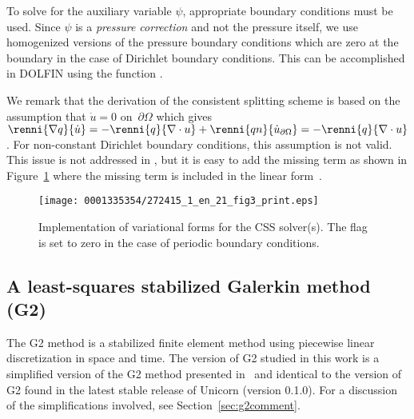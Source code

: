 To solve for the auxiliary variable $\psi$, appropriate boundary
conditions must be used. Since $\psi$ is a \emph{pressure correction}
and not the pressure itself, we use homogenized versions of the
pressure boundary conditions which are zero at the boundary in the
case of Dirichlet boundary conditions. This can be accomplished in
DOLFIN using the function .

We remark that the derivation of the consistent splitting scheme is
based on the assumption that $\dot{u} = 0$ on~$\partial\Omega$ which
gives $\renni{\nabla q}{\dot{u}} = -\renni{q}{\nabla \cdot u} +
\renni{qn}{\dot{u}_{\partial \Omega}} = -\renni{q}{\nabla \cdot
  u}$. For non-constant Dirichlet boundary conditions, this assumption
is not valid. This issue is not addressed in \citet{GuermondShen2003}, but it is
easy to add the missing term as shown in Figure~\ref{fig:impl_css}
where the missing term is included in the linear form~.

\begin{figure}[!p]
\centering
\texttt{[image: 0001335354/272415\_1\_en\_21\_fig3\_print.eps]}
\caption{Implementation of variational forms for the CSS
      solver(s). The flag  is set to zero in the case of
      periodic boundary conditions.}\label{fig:impl_css}\vspace*{45pt}
\end{figure}

\subsection{A least-squares stabilized Galerkin method (G2)}
\label{sec:g2}

The G2 method is a stabilized finite element method using piecewise
linear discretization in space and time. The version of G2 studied in
this work is a simplified version of the G2 method presented
in~\citet{HoffmanJohnson2007} and identical to the version of G2 found
in the latest stable release of Unicorn (version 0.1.0). For a
discussion of the simplifications involved, see
Section~\ref{sec:g2comment}.

